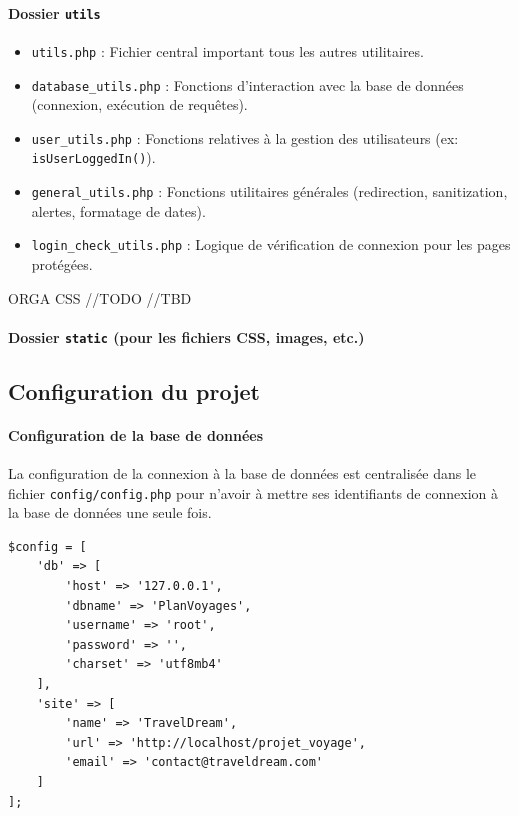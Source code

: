 \documentclass[a4paper,12pt]{article}
\begin{document}
\paragraph{Dossier \texttt{utils}}
\begin{itemize}
     \item \texttt{utils.php} : Fichier central important tous les autres utilitaires.
     \item \texttt{database\_utils.php} : Fonctions d'interaction avec la base de données (connexion, exécution de requêtes).
     \item \texttt{user\_utils.php} : Fonctions relatives à la gestion des utilisateurs (ex: \texttt{isUserLoggedIn()}).
     \item \texttt{general\_utils.php} : Fonctions utilitaires générales (redirection, sanitization, alertes, formatage de dates).
     \item \texttt{login\_check\_utils.php} : Logique de vérification de connexion pour les pages protégées.
\end{itemize}

ORGA CSS //TODO //TBD
\paragraph{Dossier \texttt{static} (pour les fichiers CSS, images, etc.)}

\vspace{0.5em}
\subsection{Configuration du projet}

\paragraph{Configuration de la base de données}
La configuration de la connexion à la base de données est centralisée dans le fichier \texttt{config/config.php} pour n'avoir à mettre ses identifiants de connexion à la base de données une seule fois.
\begin{lstlisting}
$config = [
    'db' => [
        'host' => '127.0.0.1',
        'dbname' => 'PlanVoyages',
        'username' => 'root',
        'password' => '',
        'charset' => 'utf8mb4'
    ],
    'site' => [
        'name' => 'TravelDream',
        'url' => 'http://localhost/projet_voyage',
        'email' => 'contact@traveldream.com'
    ]
];
\end{lstlisting}
\end{document}
